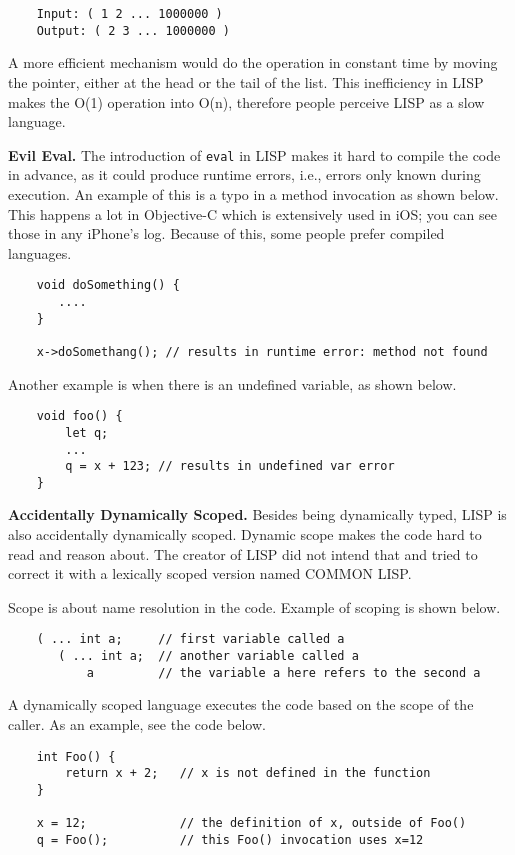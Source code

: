 \documentclass[twoside]{article}
\begin{document}
\begin{verbatim}
    Input: ( 1 2 ... 1000000 )
    Output: ( 2 3 ... 1000000 )
\end{verbatim}

A more efficient mechanism would do the operation in constant time by moving the pointer, either at the head or the tail of the list. This inefficiency in LISP makes the O(1) operation into O(n), therefore people perceive LISP as a slow language.

\textbf{Evil Eval. } The introduction of \verb|eval| in LISP makes it hard to compile the code in advance, as it could produce runtime errors, i.e., errors only known during execution. An example of this is a typo in a method invocation as shown below. This happens a lot in Objective-C which is extensively used in iOS; you can see those in any iPhone's log. Because of this, some people prefer compiled languages.
\begin{verbatim}
    void doSomething() {
       ....
    }

    x->doSomethang(); // results in runtime error: method not found
\end{verbatim}

Another example is when there is an undefined variable, as shown below.
\begin{verbatim}
    void foo() {
        let q;
        ... 
        q = x + 123; // results in undefined var error
    }
\end{verbatim}

\textbf{Accidentally Dynamically Scoped. } Besides being dynamically typed, LISP is also accidentally dynamically scoped. Dynamic scope makes the code hard to read and reason about. The creator of LISP did not intend that and tried to correct it with a lexically scoped version named COMMON LISP.

Scope is about name resolution in the code. Example of scoping is shown below.
\begin{verbatim}
    ( ... int a;     // first variable called a
       ( ... int a;  // another variable called a
           a         // the variable a here refers to the second a
\end{verbatim}

A dynamically scoped language executes the code based on the scope of the caller. As an example, see the code below.
\begin{verbatim}
    int Foo() {
        return x + 2;   // x is not defined in the function
    }

    x = 12;             // the definition of x, outside of Foo()
    q = Foo();          // this Foo() invocation uses x=12
\end{verbatim}
\end{document}
